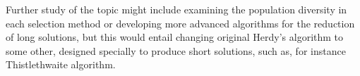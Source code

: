 \documentclass[a4paper]{article}
\begin{document}
Further study of the topic might include examining the population diversity in each selection method or developing more advanced algorithms for the reduction of long solutions,
but this would entail changing original Herdy's algorithm to some other, designed specially to produce short solutions, such as, for instance Thistlethwaite algorithm.
\end{document}
